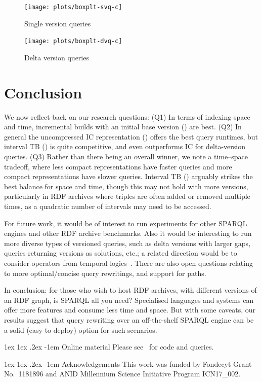 \documentclass[a4paper]{llncs}
\makeatletter
\renewcommand\paragraph{\@startsection{paragraph}{4}{\z@}%
	{1ex \@plus1ex \@minus.2ex}%
	{-1em}%
	{\normalfont\normalsize\itshape}}
\makeatother
\begin{document}
\begin{figure}[t]
\centering
\begin{minipage}{.5\textwidth}
  \centering
  \texttt{[image: plots/boxplt-svq-c]}
  \caption{Single version queries  \label{fig:svq}}
\end{minipage}%
\hfill
\begin{minipage}{.5\textwidth}
  \centering
  \texttt{[image: plots/boxplt-dvq-c]}
  \caption{Delta version queries   \label{fig:dvq}}
\end{minipage}
\end{figure}

\section{Conclusion}

We now reflect back on our research questions: (Q1) In terms of indexing space and time, incremental builds with an initial base version (\cbpd) are best. (Q2) In general the uncompressed IC representation (\ic) offers the best query runtimes, but interval TB (\tb) is quite competitive, and even outperforms IC for delta-version queries. (Q3) Rather than there being an overall winner, we note a time--space tradeoff, where less compact representations have faster queries and more compact representations have slower queries. Interval TB (\tb) arguably strikes the best balance for space and time, though this may not hold with more versions, particularly in RDF archives where triples are often added or removed multiple times, as a quadratic number of intervals may need to be accessed.

For future work, it would be of interest to run experiments for other SPARQL engines and other RDF archive benchmarks. Also it would be interesting to run more diverse types of versioned queries, such as delta versions with larger gaps, queries returning versions as solutions, etc.; a related direction would be to consider operators from temporal logics~\cite{Pnueli77}. There are also open questions relating to more optimal/concise query rewritings, and support for paths.

In conclusion: for those who wish to host RDF archives, with different versions of an RDF graph, is SPARQL all you need? Specialised languages and systems can offer more features and consume less time and space. But with some caveats, our results suggest that query rewriting over an off-the-shelf SPARQL engine can be a solid (easy-to-deploy) option for such scenarios.

\paragraph{Online material} Please see~\cite{online} for code and queries.

\paragraph{Acknowledgements} This work was funded by Fondecyt Grant No.\ 1181896 and ANID Millennium Science Initiative Program ICN17\_002.



\end{document}
